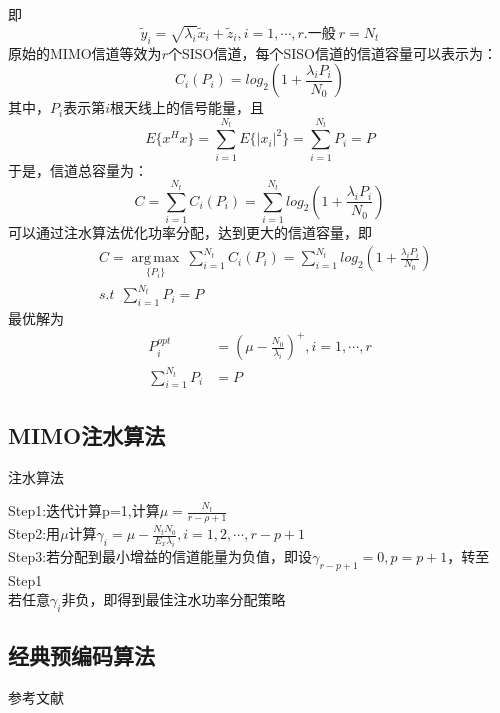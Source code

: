 即
\begin{equation}
    \tilde{y}_i=\sqrt{\lambda_i}\tilde{x}_i+\tilde{z}_i, i=1,\cdots,r.一般\ r=N_t
\end{equation}
原始的MIMO信道等效为$r$个SISO信道，每个SISO信道的信道容量可以表示为：
\begin{equation}
    C_i(P_i)=log_2(1+\frac{\lambda_iP_i}{N_0})
\end{equation}
其中，$P_i$表示第$i$根天线上的信号能量，且
\begin{equation}
    E\{x^Hx\}=\sum_{i=1}^{N_t}E\{|x_i|^2\}=\sum_{i=1}^{N_t}P_i=P
\end{equation}
于是，信道总容量为：
\begin{equation}
    C=\sum_{i=1}^{N_t}C_i(P_i)=\sum_{i=1}^{N_t}log_2(1+\frac{\lambda_iP_i}{N_0})
\end{equation}
可以通过注水算法优化功率分配，达到更大的信道容量，即
\begin{equation}
    \begin{aligned}
        & C={\underset{\{P_i\}} {\operatorname {arg\,max}}}\ \sum_{i=1}^{N_t}C_i(P_i)=\sum_{i=1}^{N_t}log_2(1+\frac{\lambda_iP_i}{N_0}) \\
        & s.t\ \  \sum_{i=1}^{N_t}P_i=P 
    \end{aligned}
\end{equation}
最优解为   
\begin{equation}
    \begin{aligned}
        P_i^{opt}&=(\mu -\frac{N_0}{\lambda_i})^+, i=1,\cdots,r \\
        \sum_{i=1}^{N_t}P_i&=P
    \end{aligned}
\end{equation}

\subsection{MIMO注水算法}
\begin{algorithm}
    \caption{注水算法}
    Step1:迭代计算p=1,计算$\mu=\frac{N_t}{r-\rho+1}$ \\
    Step2:用$\mu$计算$\gamma_i=\mu-\frac{N_tN_0}{E_x\lambda_i},i=1,2,\cdots,r-p+1$ \\
    Step3:若分配到最小增益的信道能量为负值，即设$\gamma_{r-p+1}=0,p=p+1$，转至Step1 \\
    若任意$\gamma_i$非负，即得到最佳注水功率分配策略
\end{algorithm}

\subsection{经典预编码算法}
参考文献\cite{2017Massive}
